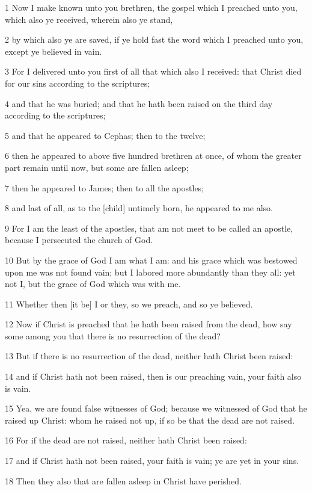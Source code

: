 \par 1 Now I make known unto you brethren, the gospel which I preached unto you, which also ye received, wherein also ye stand,
\par 2 by which also ye are saved, if ye hold fast the word which I preached unto you, except ye believed in vain.
\par 3 For I delivered unto you first of all that which also I received: that Christ died for our sins according to the scriptures;
\par 4 and that he was buried; and that he hath been raised on the third day according to the scriptures;
\par 5 and that he appeared to Cephas; then to the twelve;
\par 6 then he appeared to above five hundred brethren at once, of whom the greater part remain until now, but some are fallen asleep;
\par 7 then he appeared to James; then to all the apostles;
\par 8 and last of all, as to the [child] untimely born, he appeared to me also.
\par 9 For I am the least of the apostles, that am not meet to be called an apostle, because I persecuted the church of God.
\par 10 But by the grace of God I am what I am: and his grace which was bestowed upon me was not found vain; but I labored more abundantly than they all: yet not I, but the grace of God which was with me.
\par 11 Whether then [it be] I or they, so we preach, and so ye believed.
\par 12 Now if Christ is preached that he hath been raised from the dead, how say some among you that there is no resurrection of the dead?
\par 13 But if there is no resurrection of the dead, neither hath Christ been raised:
\par 14 and if Christ hath not been raised, then is our preaching vain, your faith also is vain.
\par 15 Yea, we are found false witnesses of God; because we witnessed of God that he raised up Christ: whom he raised not up, if so be that the dead are not raised.
\par 16 For if the dead are not raised, neither hath Christ been raised:
\par 17 and if Christ hath not been raised, your faith is vain; ye are yet in your sins.
\par 18 Then they also that are fallen asleep in Christ have perished.
